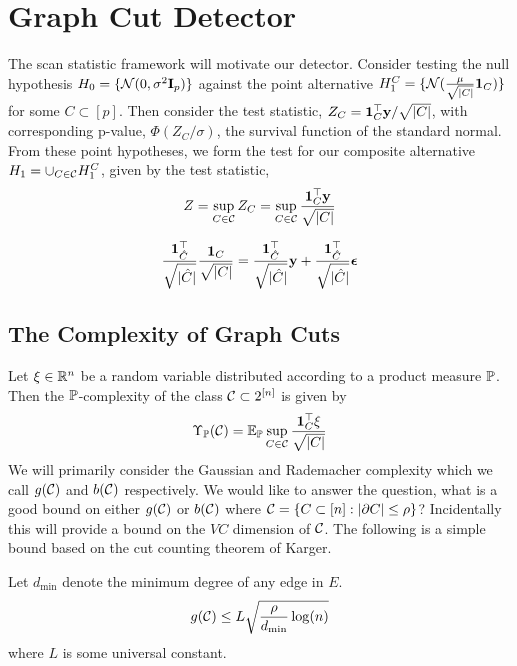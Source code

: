 \section{Graph Cut Detector}

The scan statistic framework will motivate our detector.
Consider testing the null hypothesis $H_0 = \{\mathcal{N}(0,\sigma^2 \mathbf{I}_p)\}$ against the point alternative $H_1^C = \{ \mathcal{N}( \frac{\mu}{\sqrt{|C|}} {\bf 1}_C) \}$ for some $C \subset [p]$.
Then consider the test statistic, $Z_C = {\bf 1}_C^\top \mathbf{y} / \sqrt{|C|}$, with corresponding p-value, $\Phi (Z_C/\sigma)$, the survival function of the standard normal.
From these point hypotheses, we form the test for our composite alternative $H_1 = \cup_{C \in \mathcal{C}} H_1^C$, given by the test statistic, 
\begin{equation}
\label{eq:scan_stat}
Z = \sup_{C \in \mathcal{C}} Z_C = \sup_{C \in \mathcal{C}} \frac{{\bf 1}_C^\top \mathbf{y}}{\sqrt{|C|}}
\end{equation}

\[
\begin{aligned}
\frac{{\bf 1}_{\hat C}^\top}{\sqrt{|\hat C|}} \frac{{\bf 1}_C}{\sqrt{|C|}} = \frac{{\bf 1}_{\hat C}^\top}{\sqrt{|\hat C|}} \mathbf{y} + \frac{{\bf 1}_{\hat C}^\top}{\sqrt{|\hat C|}} \bm{\epsilon}
\end{aligned}
\]

\subsection{The Complexity of Graph Cuts}

Let $\xi \in \mathbb{R}^n$ be a random variable distributed according to a product measure $\mathbb{P}$.
Then the $\mathbb{P}$-complexity of the class $\mathcal{C} \subset 2^{[n]}$ is given by
\[
\Upsilon_{\mathbb{P}}(\mathcal{C}) = \mathbb{E}_{\mathbb{P}} \sup_{C \in \mathcal{C}} \frac{{\bf 1}_C^\top \xi}{\sqrt{|C|}}
\]
We will primarily consider the Gaussian and Rademacher complexity which we call $g(\mathcal{C})$ and $b(\mathcal{C})$ respectively.
We would like to answer the question, what is a good bound on either $g(\mathcal{C})$ or $b(\mathcal{C})$ where $\mathcal{C} = \{C \subset [n] : |\partial C| \le \rho \}$?
Incidentally this will provide a bound on the $VC$ dimension of $\mathcal{C}$.
The following is a simple bound based on the cut counting theorem of Karger.

\begin{proposition}
Let $d_{\min}$ denote the minimum degree of any edge in $E$.
\[
g(\mathcal{C}) \le L \sqrt{\frac{\rho}{d_{\min}} \log(n)}
\]
where $L$ is some universal constant.
\end{proposition}

